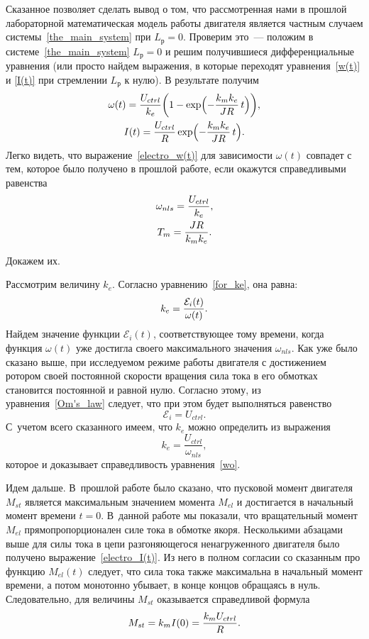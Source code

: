 \documentclass[12pt, a4paper, openany]{extarticle}
\begin{document}
Сказанное позволяет сделать вывод о том, что рассмотренная нами в прошлой лабораторной математическая модель работы двигателя является частным случаем системы~\eqref{the_main_system} при $L_\textit{р}=0$.
Проверим это~--- положим в системе~\eqref{the_main_system} $L_\textit{р}=0$ и решим получившиеся дифференциальные уравнения (или просто найдем выражения, в которые переходят уравнения~\eqref{w(t)} и \eqref{I(t)} при стремлении $L_\textit{р}$ к нулю). 
В результате получим
\begin{gather}\label{electro_w(t)}
	\omega(t) = \frac{U_{ctrl}}{k_e}\biggl(1-\exp\Bigl(-\frac{k_mk_e}{JR}\,t\Bigr)\biggr),\\
	I(t) = \frac{U_{ctrl}}{R}\exp\Bigl(-\frac{k_mk_e}{JR}\,t\Bigr)\ldotp \label{electro_I(t)}
\end{gather}
Легко видеть, что выражение~\eqref{electro_w(t)} для зависимости $\omega(t)$ совпадет с тем, которое было получено в прошлой работе, если окажутся справедливыми равенства
\begin{gather}\label{wo}
	\omega_{nls} = \frac{U_{ctrl}}{k_e},\\
	T_m = \frac{JR}{k_mk_e}\ldotp \label{Tm}
\end{gather}

Докажем их.

Рассмотрим величину $k_e$.
Согласно уравнению~\eqref{for_ke}, она равна:
\begin{equation}
	k_e = \frac{\mathcal E_i(t)}{\omega(t)}\ldotp
\end{equation}
Найдем значение функции $\mathcal E_i(t)$, соответствующее тому времени, когда функция $\omega(t)$ уже достигла своего максимального значения $\omega_{nls}$.
Как уже было сказано выше, при исследуемом режиме работы двигателя с достижением ротором своей постоянной скорости вращения сила тока в его обмотках становится постоянной и равной нулю.
Согласно этому, из уравнения~\eqref{Om's_law} следует, что при этом будет выполняться равенство
\begin{equation}\label{voltages}
	\mathcal E_i = U_{ctrl}.
\end{equation}
С~учетом всего сказанного имеем, что $k_e$ можно определить из выражения
\begin{equation}\label{ke}
	k_e = \frac{U_{ctrl}}{\omega_{nls}},
\end{equation}
которое и доказывает справедливость уравнения~\eqref{wo}.

Идем дальше.
В~прошлой работе было сказано, что пусковой момент двигателя $M_{st}$ является максимальным значением момента $M_{el}$ и достигается в начальный момент времени $t=0$.
В~данной работе мы показали, что вращательный момент $M_{el}$ прямопропорционален силе тока в обмотке якоря.
Несколькими абзацами выше для силы тока в цепи разгоняющегося ненагруженного двигателя было получено выражение~\eqref{electro_I(t)}.
Из него в полном согласии со сказанным про функцию $M_{el}(t)$ следует, что сила тока также максимальна в начальный момент времени, а потом монотонно убывает, в конце концов обращаясь в нуль.  
Следовательно, для величины $M_{st}$ оказывается справедливой формула
\begin{equation}\label{Mst}
	M_{st} = k_mI(0) = \frac{k_mU_{ctrl}}{R}\ldotp
\end{equation}
\end{document}
